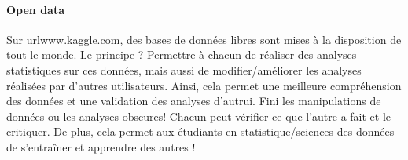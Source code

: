 \documentclass[10pt]{../fiche}
\begin{document}
\paragraph{Open data} Sur url{www.kaggle.com}, des bases de données libres sont mises à la disposition de tout le monde. Le principe ? Permettre à chacun de réaliser des analyses statistiques sur ces données, mais aussi de modifier/améliorer les analyses réalisées par d'autres utilisateurs. Ainsi, cela permet une meilleure compréhension des données et une validation des analyses d'autrui. Fini les manipulations de données ou les analyses obscures! Chacun peut vérifier ce que l'autre a fait et le critiquer. De plus, cela permet aux étudiants en statistique/sciences des données de s'entraîner et apprendre des autres !
\end{document}
